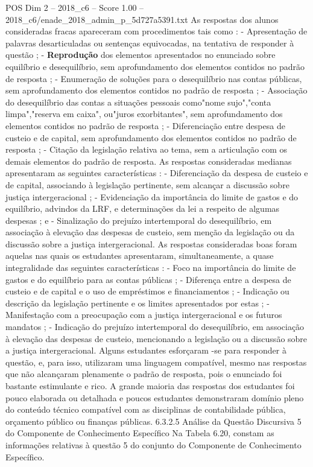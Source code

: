 \begin{textsample}{POS Dim 2 – 2018\_c6 – Score 1.00 – 2018\_c6/enade\_2018\_admin\_p\_5d727a5391.txt}
As respostas dos alunos consideradas fracas apareceram com procedimentos tais como : - Apresentação de palavras desarticuladas ou sentenças equivocadas, na tentativa de responder à questão ; - \textbf{Reprodução} dos elementos apresentados no enunciado sobre equilíbrio e desequilíbrio, sem aprofundamento dos elementos contidos no padrão de resposta ; - Enumeração de soluções para o desequilíbrio nas contas públicas, sem aprofundamento dos elementos contidos no padrão de resposta ; - Associação do desequilíbrio das contas a situações pessoais como"nome sujo","conta limpa","reserva em caixa", ou"juros exorbitantes", sem aprofundamento dos elementos contidos no padrão de resposta ; - Diferenciação entre despesa de custeio e de capital, sem aprofundamento dos elementos contidos no padrão de resposta ; - Citação da legislação relativa ao tema, sem a articulação com os demais elementos do padrão de resposta.
As respostas consideradas medianas apresentaram as seguintes características : - Diferenciação da despesa de custeio e de capital, associando à legislação pertinente, sem alcançar a discussão sobre justiça intergeracional ; - Evidenciação da importância do limite de gastos e do equilíbrio, advindos da LRF, e determinações da lei a respeito de algumas despesas ; e - Sinalização do prejuízo intertemporal do desequilíbrio, em associação à elevação das despesas de custeio, sem menção da legislação ou da discussão sobre a justiça intergeracional.
As respostas consideradas boas foram aquelas nas quais os estudantes apresentaram, simultaneamente, a quase integralidade das seguintes características : - Foco na importância do limite de gastos e do equilíbrio para as contas públicas ; - Diferença entre a despesa de custeio e de capital e o uso de empréstimos e financiamentos ; - Indicação ou descrição da legislação pertinente e os limites apresentados por estas ; - Manifestação com a preocupação com a justiça intergeracional e os futuros mandatos ; - Indicação do prejuízo intertemporal do desequilíbrio, em associação à elevação das despesas de custeio, mencionando a legislação ou a discussão sobre a justiça intergeracional.
Alguns estudantes esforçaram -se para responder à questão, e, para isso, utilizaram uma linguagem compatível, mesmo nas respostas que não alcançaram plenamente o padrão de resposta, pois o enunciado foi bastante estimulante e rico.
A grande maioria das respostas dos estudantes foi pouco elaborada ou detalhada e poucos estudantes demonstraram domínio pleno do conteúdo técnico compatível com as disciplinas de contabilidade pública, orçamento público ou finanças públicas. 6.3.2.5 Análise da Questão Discursiva 5 do Componente de Conhecimento Específico Na Tabela 6.20, constam as informações relativas à questão 5 do conjunto do Componente de Conhecimento Específico.

\end{textsample}
